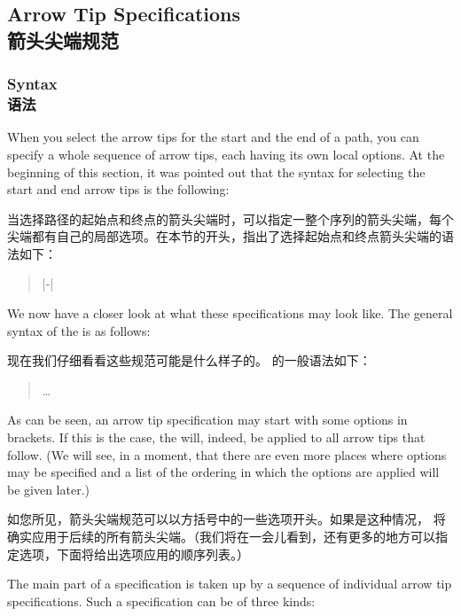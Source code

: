 \subsection{Arrow Tip Specifications\\箭头尖端规范}
\label{section-arrow-spec}

\subsubsection{Syntax\\语法}

When you select the arrow tips for the start and the end of a path, you can
specify a whole sequence of arrow tips, each having its own local options. At
the beginning of this section, it was pointed out that the syntax for selecting
the start and end arrow tips is the following:

当选择路径的起始点和终点的箭头尖端时，可以指定一整个序列的箭头尖端，每个尖端都有自己的局部选项。在本节的开头，指出了选择起始点和终点箭头尖端的语法如下：
%
\begin{quote}
    |-|
\end{quote}

We now have a closer look at what these specifications may look like. The
general syntax of the  is as follows:

现在我们仔细看看这些规范可能是什么样子的。 的一般语法如下：

%
\begin{quote}
     
      \dots
\end{quote}
%
As can be seen, an arrow tip specification may start with some options in
brackets. If this is the case, the  will, indeed, be
applied to all arrow tips that follow. (We will see, in a moment, that there
are even more places where options may be specified and a list of the ordering
in which the options are applied will be given later.)

如您所见，箭头尖端规范可以以方括号中的一些选项开头。如果是这种情况， 将确实应用于后续的所有箭头尖端。（我们将在一会儿看到，还有更多的地方可以指定选项，下面将给出选项应用的顺序列表。）

The main part of a specification is taken up by a sequence of individual arrow
tip specifications. Such a specification can be of three kinds:

